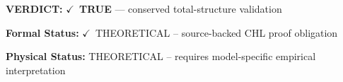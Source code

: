 \textbf{VERDICT:} \ensuremath{\checkmark}\ \textbf{TRUE} --- conserved total-structure validation

\textbf{Formal Status:} \ensuremath{\checkmark}\ THEORETICAL -- source-backed CHL proof obligation

\textbf{Physical Status:} THEORETICAL -- requires model-specific empirical interpretation
\par\vspace{0.45em}
\par
\ifTZPDarkEdition
{}
\fi
\endgroup
\endgroup
